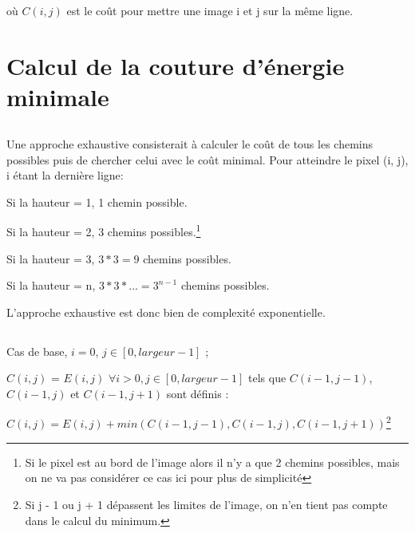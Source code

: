 \subsection{} %
	
	où $C(i,j)$ est le coût pour mettre 	une image i et j sur la même ligne. 
	
\subsection{} %
\subsection{} %
\subsection{} %

\setcounter{section}{0}

\section{Calcul de la couture d'énergie minimale} %
\subsection{} %
Une approche exhaustive consisterait à calculer le coût de tous les chemins possibles puis de chercher celui avec le coût minimal.
Pour atteindre le pixel (i, j), i étant la dernière ligne:

Si la hauteur = 1, 1 chemin possible.

Si la hauteur = 2, 3 chemins possibles.\footnote{Si le pixel est au bord de l'image alors il n'y a que 2 chemins possibles, mais on ne va pas considérer ce cas ici pour plus de simplicité}

Si la hauteur = 3, $3*3=9$ chemins possibles.

Si la hauteur = n, $3*3*...=3^{n-1}$ chemins possibles.

L'approche exhaustive est donc bien de complexité exponentielle.
\subsection{} %
Cas de base, $i = 0$, $j \in [0, largeur - 1]$ ;

 $C(i, j)$ = $E(i, j)$
\bigbreak
$\forall i > 0, j \in [0, largeur - 1]$ tels que $C(i - 1, j -1)$, $C(i - 1, j)$ et $C(i - 1, j + 1)$ sont définis :

$C(i, j) = E(i, j) + min(C(i - 1, j -1), C(i - 1, j), C(i - 1, j + 1))$\footnote{Si j - 1 ou j + 1 dépassent les limites de l'image, on n'en tient pas compte dans le calcul du minimum.}
